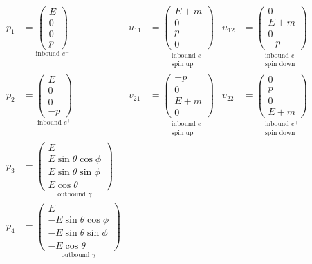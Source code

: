 \documentclass[12pt]{article}
\begin{document}
\else
\begin{align*}
p_1&=\underset{\text{inbound $e^-$}}
{\begin{pmatrix}E\\0\\0\\p\end{pmatrix}}
& u_{11}&=\underset{\substack{\text{inbound $e^-$}\\\text{spin up}}}
{\begin{pmatrix}E+m\\0\\p\\0\end{pmatrix}}
& u_{12}&=\underset{\substack{\text{inbound $e^-$}\\\text{spin down}}}
{\begin{pmatrix}0\\E+m\\0\\-p\end{pmatrix}}
\\[1ex]
p_2&=\underset{\text{inbound $e^+$}}
{\begin{pmatrix}E\\0\\0\\-p\end{pmatrix}}
& v_{21}&=\underset{\substack{\text{inbound $e^+$}\\\text{spin up}}}
{\begin{pmatrix}-p\\0\\E+m\\0\end{pmatrix}}
& v_{22}&=\underset{\substack{\text{inbound $e^+$}\\\text{spin down}}}
{\begin{pmatrix}0\\p\\0\\E+m\end{pmatrix}}
\\[1ex]
p_3&=\underset{\text{outbound $\gamma$}}
{\begin{pmatrix}E\\ E\sin\theta\cos\phi\\ E\sin\theta\sin\phi\\ E\cos\theta\end{pmatrix}}
\\[1ex]
p_4&=
\underset{\text{outbound $\gamma$}}
{\begin{pmatrix}E\\ -E\sin\theta\cos\phi\\ -E\sin\theta\sin\phi\\ -E\cos\theta\end{pmatrix}}
\end{align*}
\fi
\end{document}
